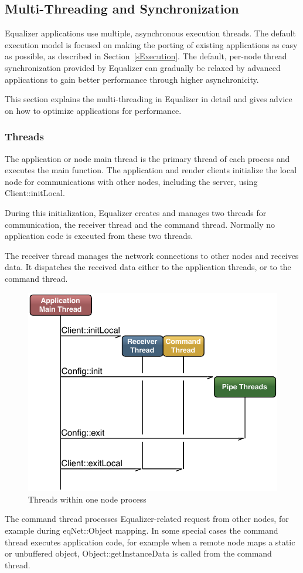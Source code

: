 \documentclass[10pt,a4]{scrartcl}
\newcommand{\sref}[1]{Section~\ref{#1}}
\begin{document}
\subsection{\label{sThreads}Multi-Threading and Synchronization}

Equalizer applications use multiple, asynchronous execution threads. The
default execution model is focused on making the porting of existing
applications as easy as possible, as described in \sref{sExecution}. The
default, per-node thread synchronization provided by Equalizer can
gradually be relaxed by advanced applications to gain better performance
through higher asynchronicity.

This section explains the multi-threading in Equalizer in detail and
gives advice on how to optimize applications for performance.

\subsubsection{Threads}

The application or node main thread is the primary thread of each
process and executes the \textsf{main} function. The application and
render clients initialize the local node for communications with other
nodes, including the server, using \textsf{Client::initLocal}.

During this initialization, Equalizer creates and manages two threads
for communication, the receiver thread and the command thread. Normally
no application code is executed from these two threads.

The receiver thread manages the network connections to other nodes and
receives data. It dispatches the received data either to the application
threads, or to the command thread.

\begin{figure}
  \includegraphics[width=.618\textwidth]{images/threads.pdf}
  {\caption{\small\label{fThreads}Threads within one node process}}
\end{figure}
The command thread processes Equalizer-related request from other nodes,
for example during \textsf{eqNet::Object} mapping. In some special cases
the command thread executes application code, for example when a remote
node maps a static or unbuffered object,
\textsf{Object::getInstanceData} is called from the command thread.
\end{document}

